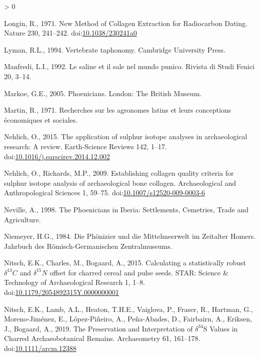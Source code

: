 \documentclass[5p]{elsarticle} %
\newlength{\cslhangindent}
\newenvironment{CSLReferences}[2] %
 {%
  \setlength{\parindent}{0pt}
  \ifodd #1 \everypar{\setlength{\hangindent}{\cslhangindent}}\ignorespaces\fi
  \ifnum #2 > 0
  \setlength{\parskip}{#2\baselineskip}
  \fi
 }%
 {}
\begin{document}
\begin{CSLReferences}{1}{0}
\leavevmode\hypertarget{ref-longin71}{}%
Longin, R., 1971. New {Method} of {Collagen Extraction} for {Radiocarbon Dating}. Nature 230, 241--242. doi:\href{https://doi.org/10.1038/230241a0}{10.1038/230241a0}

\leavevmode\hypertarget{ref-lyman94}{}%
Lyman, R.L., 1994. Vertebrate taphonomy. {Cambridge University Press}.

\leavevmode\hypertarget{ref-manfredi92}{}%
Manfredi, L.I., 1992. Le saline et il sale nel mundo punico. Rivista di Studi Fenici 20, 3--14.

\leavevmode\hypertarget{ref-markoe05}{}%
Markoe, G.E., 2005. Phoenicians. {London}: {The British Museum}.

\leavevmode\hypertarget{ref-martin71}{}%
Martin, R., 1971. Recherches sur les agronomes latins et leurs conceptions économiques et sociales.

\leavevmode\hypertarget{ref-nehlich15}{}%
Nehlich, O., 2015. The application of sulphur isotope analyses in archaeological research: {A} review. Earth-Science Reviews 142, 1--17. doi:\href{https://doi.org/10.1016/j.earscirev.2014.12.002}{10.1016/j.earscirev.2014.12.002}

\leavevmode\hypertarget{ref-nehlich_richards09}{}%
Nehlich, O., Richards, M.P., 2009. Establishing collagen quality criteria for sulphur isotope analysis of archaeological bone collagen. Archaeological and Anthropological Sciences 1, 59--75. doi:\href{https://doi.org/10.1007/s12520-009-0003-6}{10.1007/s12520-009-0003-6}

\leavevmode\hypertarget{ref-neville98}{}%
Neville, A., 1998. The {Phoenicians} in {Iberia}: {Settlements}, {Cemetries}, {Trade} and {Agriculture}.

\leavevmode\hypertarget{ref-niemeyer84}{}%
Niemeyer, H.G., 1984. Die {Phönizier} und die {Mittelmeerwelt} im {Zeitalter Homers}. {Jahrbuch des Römisch-Germanischen Zentralmuseums}.

\leavevmode\hypertarget{ref-nitsch_etal15}{}%
Nitsch, E.K., Charles, M., Bogaard, A., 2015. Calculating a statistically robust \(\delta ^{13}C\) and \(\delta ^{15}N\) offset for charred cereal and pulse seeds. STAR: Science \& Technology of Archaeological Research 1, 1--8. doi:\href{https://doi.org/10.1179/2054892315Y.0000000001}{10.1179/2054892315Y.0000000001}

\leavevmode\hypertarget{ref-nitsch_etal19}{}%
Nitsch, E.K., Lamb, A.L., Heaton, T.H.E., Vaiglova, P., Fraser, R., Hartman, G., Moreno-Jiménez, E., López-Piñeiro, A., Peña-Abades, D., Fairbairn, A., Eriksen, J., Bogaard, A., 2019. The {Preservation} and {Interpretation} of {\(\delta^{34}\)S Values} in {Charred Archaeobotanical Remains}. Archaeometry 61, 161--178. doi:\href{https://doi.org/10.1111/arcm.12388}{10.1111/arcm.12388}


\end{CSLReferences}
\end{document}
